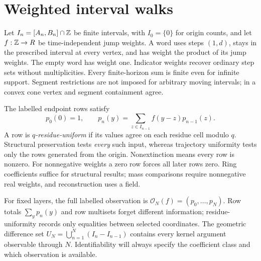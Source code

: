 \section{Weighted interval walks}
Let $I_n=[A_n,B_n]\cap\mathbb Z$ be finite intervals, with $I_0=\{0\}$ for origin counts, and let $f:\mathbb Z\to R$ be time-independent jump weights. A word uses steps $(1,d)$, stays in the prescribed interval at every vertex, and has weight the product of its jump weights. The empty word has weight one. Indicator weights recover ordinary step sets without multiplicities. Every finite-horizon sum is finite even for infinite support. Segment restrictions are not imposed for arbitrary moving intervals; in a convex cone vertex and segment containment agree.

The labelled endpoint rows satisfy
\[
p_0(0)=1,\qquad p_n(y)=\sum_{z\in I_{n-1}}f(y-z)p_{n-1}(z).
\]
A row is \emph{$q$-residue-uniform} if its values agree on each residue cell modulo $q$. Structural preservation tests \emph{every} such input, whereas trajectory uniformity tests only the rows generated from the origin. Nonextinction means every row is nonzero. For nonnegative weights a zero row forces all later rows zero. Ring coefficients suffice for structural results; mass comparisons require nonnegative real weights, and reconstruction uses a field.

For fixed layers, the full labelled observation is $\mathcal O_N(f)=(p_0,\ldots,p_N)$. Row totals $\sum_y p_n(y)$ and row multisets forget different information; residue-uniformity records only equalities between selected coordinates. The geometric difference set $U_N=\bigcup_{n=1}^N(I_n-I_{n-1})$ contains every kernel argument observable through $N$. Identifiability will always specify the coefficient class and which observation is available.
